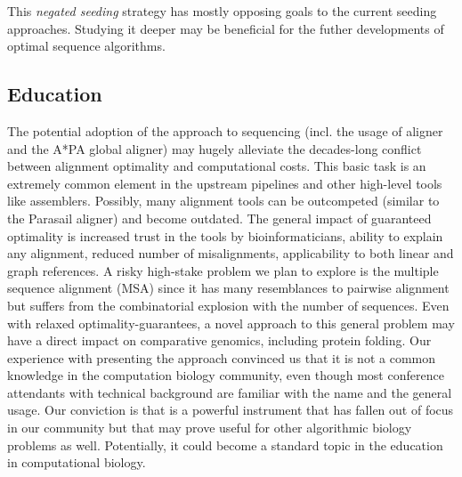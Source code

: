 This \emph{negated seeding} strategy has mostly opposing goals to the current
seeding approaches. Studying it deeper may be beneficial for the futher
developments of optimal sequence algorithms.


\subsection*{Education}

The potential adoption of the \A approach to sequencing (incl. the usage of
\astarix aligner and the A*PA global aligner) may hugely alleviate the
decades-long conflict between alignment optimality and computational costs. This
basic task is an extremely common element in the upstream pipelines and other
high-level tools like assemblers. Possibly, many alignment tools can be
outcompeted (similar to the Parasail aligner) and become outdated. The general
impact of guaranteed optimality is increased trust in the tools by
bioinformaticians, ability to explain any alignment, reduced number of
misalignments, applicability to both linear and graph references. A risky
high-stake problem we plan to explore is the multiple sequence alignment (MSA)
since it has many resemblances to pairwise alignment but suffers from the
combinatorial explosion with the number of sequences. Even with relaxed
optimality-guarantees, a novel approach to this general problem may have a
direct impact on comparative genomics, including protein folding. Our experience
with presenting the \A approach convinced us that it is not a common knowledge
in the computation biology community, even though most conference attendants
with technical background are familiar with the name and the general usage. Our
conviction is that \A is a powerful instrument that has fallen out of focus in
our community but that may prove useful for other algorithmic biology problems
as well. Potentially, it could become a standard topic in the education in
computational biology.